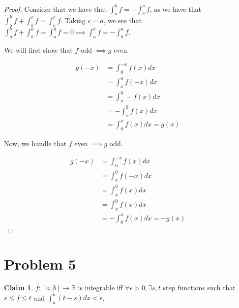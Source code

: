 \documentclass[12pt,letterpaper]{article}
\theoremstyle{definition}
\newtheorem*{claim}{Claim}
\newcommand{\R}{\mathbb{R}}
\begin{document}
\begin{proof}
  Consider that we have that $\int_a^bf = -\int_b^a f$, as we have that
  $\int_a^b f + \int_b^c f = \int_a^c f$. Taking $c =a$, we see that $\int_a^bf
  + \int_b^a f = \int_a^a f = 0 \implies \int_a^b f = -\int_b^a f$.

  We will first show that $f$ odd $\implies g$ even.

  \begin{align*}
    g(-x) &= \int_0^{-x}f(x)dx \\
          &= \int_x^0 f(-x)dx \\
          &= \int_x^0 -f(x)dx \\
          &= -\int_x^0 f(x)dx \\
          &= \int_0^x f(x)dx = g(x)
  \end{align*}

  Now, we handle that $f$ even $\implies g$ odd.

  \begin{align*}
    g(-x) &= \int_0^{-x}f(x)dx \\
          &= \int_x^0 f(-x)dx \\
          &= \int_x^0 f(x)dx \\
          &= \int_x^0 f(x)dx \\
          &= -\int_0^x f(x)dx = -g(x)
  \end{align*}
\end{proof}

\section*{Problem 5}

\begin{claim}
  $f: [a,b] \rightarrow \R$ is integrable iff $\forall \epsilon > 0, \exists
  s,t$ step functions such that $s \leq f \leq t$ and $\int_a^b(t - s)dx < \epsilon$.
\end{claim}
\end{document}
